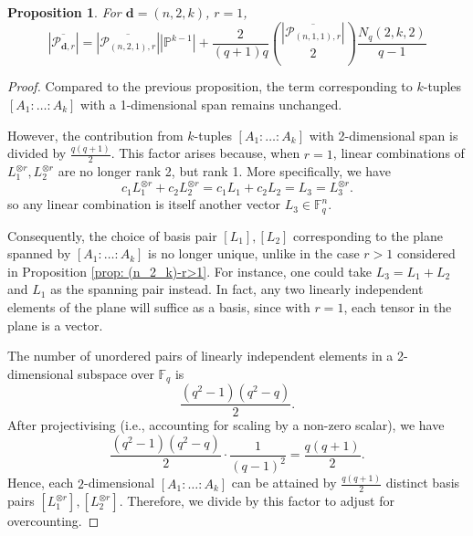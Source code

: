 \documentclass[a4paper]{cas-sc}
\newcommand{\dd}{\mathbf{d}}    %
\newcommand{\F}{\mathbb{F}}
\newtheorem{proposition}[theorem]{Proposition}
\begin{document}
\begin{proposition}\label{prop: (n_2_k)-r = 1}
    For $\dd = (n,2,k)$, $r = 1$,
    \begin{equation} \label{eq: (n_2_k)-r = 1}
        \left|\overline{\mathcal{P}_{\dd, r}}\right| = \left|\overline{\mathcal{P}_{(n,2,1), r}}\right| \left|\mathbb{P}^{k-1}\right| + \frac{2}{(q+1)q}\binom{\left|\overline{\mathcal{P}_{(n,1,1), r}}\right|}{2}\frac{N_{q}(2,k,2)}{q-1}
    \end{equation}
\end{proposition}
\begin{proof}
    Compared to the previous proposition, the term corresponding to $k$-tuples $\left[A_1: \ldots: A_k\right]$ with a 1-dimensional span remains unchanged. 
    
    However, the contribution from $k$-tuples $\left[A_1: \ldots: A_k\right]$ with 2-dimensional span is divided by $\frac{q(q+1)}{2}$. This factor arises because, when $r = 1$, linear combinations of $L_1^{\otimes r}, L_2^{\otimes r}$ are no longer rank 2, but rank 1. More specifically, we have
    $$c_1 L_1^{\otimes r}+ c_2L_2^{\otimes r} = c_1 L_1 + c_2L_2 = L_3 = L_3^{\otimes r}.$$
    so any linear combination is itself another vector $L_3 \in \F_q^n$. 
    
    Consequently, the choice of basis pair $\left[L_1\right], \left[L_2\right]$ corresponding to the plane spanned by $\left[A_1: \ldots: A_k\right]$ is no longer unique, unlike in the case $r > 1$ considered in Proposition \ref{prop: (n_2_k)-r>1}. For instance, one could take $L_3 = L_1 + L_2$ and $L_1$ as the spanning pair instead. In fact, any two linearly independent elements of the plane will suffice as a basis, since with $r =1$, each tensor in the plane is a vector.
    
    The number of unordered pairs of linearly independent elements in a 2-dimensional subspace over $\F_q$ is 
    \[
    \frac{(q^2 - 1)(q^2 - q)}{2}.
    \]
    After projectivising (i.e., accounting for scaling by a non-zero scalar), we have
    \[
    \frac{(q^2 - 1)(q^2 - q)}{2} \cdot \frac{1}{(q-1)^2} = \frac{q(q+1)}{2}.
    \]
    Hence, each $2$-dimensional $\left[A_1: \ldots: A_k\right]$ can be attained by $\frac{q(q+1)}{2}$ distinct basis pairs $\left[L_1^{\otimes r}\right], \left[L_2^{\otimes r}\right]$. Therefore, we divide by this factor to adjust for overcounting.
\end{proof}
\end{document}
